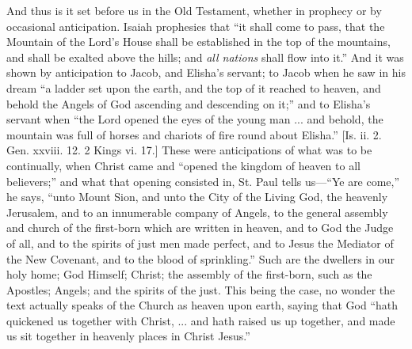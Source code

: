 And thus is it set before us in the Old Testament, whether in
prophecy or by occasional anticipation. Isaiah prophesies that
``it shall come to pass, that the Mountain of the Lord's House
shall be established in the top of the mountains, and shall be exalted
above the hills; and \emph{all nations} shall flow into it.'' And
it was shown by anticipation to Jacob, and Elisha's servant; to Jacob
when he saw in his dream ``a ladder set upon the earth, and the
top of it reached to heaven, and behold the Angels of God ascending
and descending on it;'' and to Elisha's servant when ``the
Lord opened the eyes of the young man ... and behold, the mountain was
full of horses and chariots of fire round about Elisha.'' [Is. ii.
2. Gen. xxviii. 12. 2 Kings vi. 17.] These were anticipations of what
was to be continually, when Christ came and ``opened the kingdom
of heaven to all believers;'' and what that opening consisted in,
St. Paul tells us—``Ye are come,'' he says, ``unto Mount
Sion, and unto the City of the Living God, the heavenly Jerusalem, and
to an innumerable company of Angels, to the general assembly and
church of the first-born which are written in heaven, and to God the
Judge of all, and to the spirits of just men made perfect, and to
Jesus the Mediator of the New Covenant, and to the blood of
sprinkling.'' Such are the dwellers in our holy home; God Himself;
Christ; the assembly of the first-born, such as the Apostles; Angels;
and the spirits of the just. This being the case, no wonder the text
actually speaks of the Church as heaven upon earth, saying that God
``hath quickened us together with Christ, ... and hath raised us
up together, and made us sit together in heavenly places in Christ
Jesus.''

